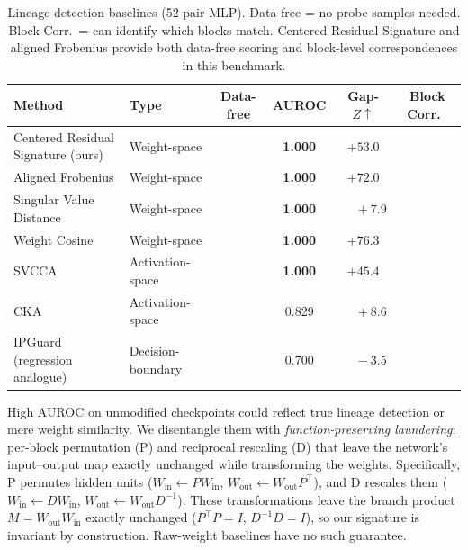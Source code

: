 \documentclass[letterpaper]{article}
\newcommand{\cmark}{\ding{51}}
\newcommand{\xmark}{\ding{55}}
\begin{document}
\begin{table}[!t]
\centering
\small
\begin{tabular}{@{}llcccc@{}}
\toprule
Method & Type & Data-free & AUROC & Gap-$Z\uparrow$ & Block Corr.\ \\
\midrule
Centered Residual Signature (ours) & Weight-space     & \cmark & \textbf{1.000} & $+53.0$ & \cmark \\
Aligned Frobenius         & Weight-space     & \cmark & \textbf{1.000} & $\mathbf{+72.0}$ & \cmark \\
Singular Value Distance   & Weight-space     & \cmark & \textbf{1.000} & $\phantom{+}+7.9$ & \xmark \\
Weight Cosine             & Weight-space     & \cmark & \textbf{1.000} & $\mathbf{+76.3}$ & \xmark \\
SVCCA~\citep{raghu2017svcca}             & Activation-space & \xmark & \textbf{1.000} & $+45.4$ & \xmark \\
CKA~\citep{kornblith2019similarity}      & Activation-space & \xmark & 0.829 & $\phantom{+}+8.6$ & \xmark \\
IPGuard~\citep{cao2021ipguard} (regression analogue) & Decision-boundary & \xmark & 0.700 & $\phantom{+}-3.5$ & \xmark \\
\bottomrule
\end{tabular}
\caption{Lineage detection baselines (52-pair MLP). Data-free = no probe samples needed. Block Corr.\ = can identify which blocks match. Centered Residual Signature and aligned Frobenius provide both data-free scoring and block-level correspondences in this benchmark.}
\label{tab:baselines}
\end{table}

High AUROC on unmodified checkpoints could reflect true lineage detection or mere weight similarity. We disentangle them with \emph{function-preserving laundering}: per-block permutation (P) and reciprocal rescaling (D) that leave the network's input--output map exactly unchanged while transforming the weights. Specifically, P permutes hidden units ($W_{\mathrm{in}} \leftarrow P W_{\mathrm{in}}$, $W_{\mathrm{out}} \leftarrow W_{\mathrm{out}} P^\top$), and D rescales them ($W_{\mathrm{in}} \leftarrow D W_{\mathrm{in}}$, $W_{\mathrm{out}} \leftarrow W_{\mathrm{out}} D^{-1}$). These transformations leave the branch product $M = W_{\mathrm{out}} W_{\mathrm{in}}$ exactly unchanged ($P^\top P = I$, $D^{-1} D = I$), so our signature is invariant by construction. Raw-weight baselines have no such guarantee.
\end{document}
